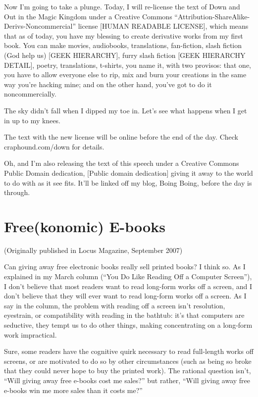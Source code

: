 Now I'm going to take a plunge. Today, I will re-license the text
of Down and Out in the Magic Kingdom under a Creative Commons
``Attribution-ShareAlike-Derivs-Noncommercial'' license [HUMAN
READABLE LICENSE], which means that as of today, you have my
blessing to create derivative works from my first book. You can
make movies, audiobooks, translations, fan-fiction, slash fiction
(God help us) [GEEK HIERARCHY], furry slash fiction [GEEK HIERARCHY
DETAIL], poetry, translations, t-shirts, you name it, with two
provisos: that one, you have to allow everyone else to rip, mix and
burn your creations in the same way you're hacking mine; and on the
other hand, you've got to do it noncommercially.

The sky didn't fall when I dipped my toe in. Let's see what happens
when I get in up to my knees.

The text with the new license will be online before the end of the
day. Check craphound.com/down for details.

Oh, and I'm also releasing the text of this speech under a Creative
Commons Public Domain dedication, [Public domain dedication] giving
it away to the world to do with as it see fits. It'll be linked off
my blog, Boing Boing, before the day is through.

\section{Free(konomic) E-books}

(Originally published in Locus Magazine, September 2007)

Can giving away free electronic books really sell printed books? I
think so. As I explained in my March column (``You Do Like Reading
Off a Computer Screen''), I don't believe that most readers want to
read long-form works off a screen, and I don't believe that they
will ever want to read long-form works off a screen. As I say in
the column, the problem with reading off a screen isn't resolution,
eyestrain, or compatibility with reading in the bathtub: it's that
computers are seductive, they tempt us to do other things, making
concentrating on a long-form work impractical.

Sure, some readers have the cognitive quirk necessary to read
full-length works off screens, or are motivated to do so by other
circumstances (such as being so broke that they could never hope to
buy the printed work). The rational question isn't, ``Will giving
away free e-books cost me sales?'' but rather, ``Will giving away
free e-books win me more sales than it costs me?''

